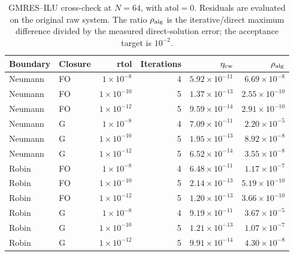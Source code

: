\begin{table}[htbp]
\centering
\footnotesize
\setlength{\tabcolsep}{4pt}
\begin{tabular}{llrrrr}
\toprule
Boundary & Closure & rtol & Iterations & $\eta_{\rm cw}$ & $\rho_{\rm alg}$ \\
\midrule
Neumann & FO & $1\times10^{-8}$ & 4 & $5.92\times10^{-11}$ & $6.69\times10^{-8}$ \\
Neumann & FO & $1\times10^{-10}$ & 5 & $1.37\times10^{-13}$ & $2.55\times10^{-10}$ \\
Neumann & FO & $1\times10^{-12}$ & 5 & $9.59\times10^{-14}$ & $2.91\times10^{-10}$ \\
Neumann & G & $1\times10^{-8}$ & 4 & $7.09\times10^{-11}$ & $2.20\times10^{-5}$ \\
Neumann & G & $1\times10^{-10}$ & 5 & $1.95\times10^{-13}$ & $8.92\times10^{-8}$ \\
Neumann & G & $1\times10^{-12}$ & 5 & $6.52\times10^{-14}$ & $3.55\times10^{-8}$ \\
Robin & FO & $1\times10^{-8}$ & 4 & $6.48\times10^{-11}$ & $1.17\times10^{-7}$ \\
Robin & FO & $1\times10^{-10}$ & 5 & $2.14\times10^{-13}$ & $5.19\times10^{-10}$ \\
Robin & FO & $1\times10^{-12}$ & 5 & $1.20\times10^{-13}$ & $3.66\times10^{-10}$ \\
Robin & G & $1\times10^{-8}$ & 4 & $9.19\times10^{-11}$ & $3.67\times10^{-5}$ \\
Robin & G & $1\times10^{-10}$ & 5 & $1.21\times10^{-13}$ & $1.07\times10^{-7}$ \\
Robin & G & $1\times10^{-12}$ & 5 & $9.91\times10^{-14}$ & $4.30\times10^{-8}$ \\
\bottomrule
\end{tabular}
\caption{GMRES--ILU cross-check at $N=64$, with $\mathrm{atol}=0$. Residuals are evaluated on the original raw system. The ratio $\rho_{\rm alg}$ is the iterative/direct maximum difference divided by the measured direct-solution error; the acceptance target is $10^{-2}$.}
\label{tab:gmres-summary}
\end{table}
